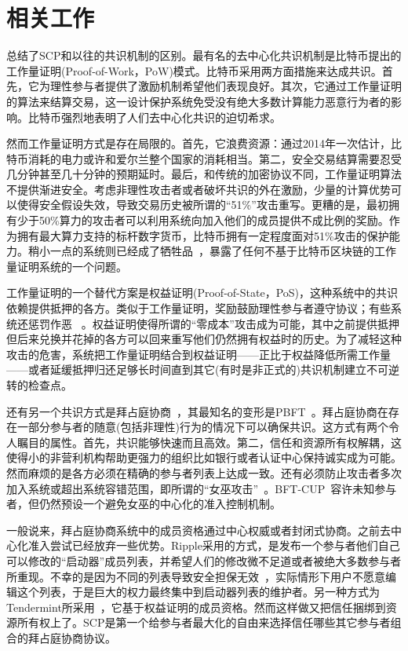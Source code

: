 \section{相关工作}

总结了SCP和以往的共识机制的区别。最有名的去中心化共识机制是比特币提出的工作量证明(Proof-of-Work，PoW)模式。比特币采用两方面措施来达成共识。首先，它为理性参与者提供了激励机制希望他们表现良好。其次，它通过工作量证明的算法来结算交易，这一设计保护系统免受没有绝大多数计算能力恶意行为者的影响。比特币强烈地表明了人们去中心化共识的迫切希求。

然而工作量证明方式是存在局限的。首先，它浪费资源：通过2014年一次估计，比特币消耗的电力或许和爱尔兰整个国家的消耗相当。第二，安全交易结算需要忍受几分钟甚至几十分钟的预期延时。最后，和传统的加密协议不同，工作量证明算法不提供渐进安全。考虑非理性攻击者或者破坏共识的外在激励，少量的计算优势可以使得安全假设失效，导致交易历史被所谓的``51\%''攻击重写。更糟的是，最初拥有少于50\%算力的攻击者可以利用系统向加入他们的成员提供不成比例的奖励。作为拥有最大算力支持的标杆数字货币，比特币拥有一定程度面对51\%攻击的保护能力。稍小一点的系统则已经成了牺牲品~\cite{attack_bbt2013,attack_cb2013}，暴露了任何不基于比特币区块链的工作量证明系统的一个问题。

工作量证明的一个替代方案是权益证明(Proof-of-State，PoS)，这种系统中的共识依赖提供抵押的各方。类似于工作量证明，奖励鼓励理性参与者遵守协议；有些系统还惩罚作恶~\cite{slasher2014, neucoin2015} 。权益证明使得所谓的``零成本''攻击成为可能，其中之前提供抵押但后来兑换并花掉的各方可以回来重写他们仍然拥有权益时的历史。为了减轻这种攻击的危害，系统把工作量证明结合到权益证明——正比于权益降低所需工作量——或者延缓抵押归还足够长时间直到其它(有时是非正式的)共识机制建立不可逆转的检查点。

还有另一个共识方式是拜占庭协商~\cite{Pease:1980:RAP:322186.322188,Lamport:1982:BGP:357172.357176}，其最知名的变形是PBFT~\cite{Castro:1999:PBFT}。拜占庭协商在存在一部分参与者的随意(包括非理性)行为的情况下可以确保共识。这方式有两个令人瞩目的属性。首先，共识能够快速而且高效。第二，信任和资源所有权解耦，这使得小的非营利机构帮助更强力的组织比如银行或者认证中心保持诚实成为可能。然而麻烦的是各方必须在精确的参与者列表上达成一致。还有必须防止攻击者多次加入系统或超出系统容错范围，即所谓的``女巫攻击''~\cite{Douceur:2002:SA:646334.687813}。BFT-CUP~\cite{Alchieri:2008:BCU:1496310.1496316}容许未知参与者，但仍然预设一个避免女巫的中心化的准入控制机制。

一般说来，拜占庭协商系统中的成员资格通过中心权威或者封闭式协商。之前去中心化准入尝试已经放弃一些优势。Ripple采用的方式，是发布一个参与者他们自己可以修改的``启动器''成员列表，并希望人们的修改微不足道或者被绝大多数参与者所重现。不幸的是因为不同的列表导致安全担保无效~\cite{ripple2014}，实际情形下用户不愿意编辑这个列表，于是巨大的权力最终集中到启动器列表的维护者。另一种方式为Tendermint所采用~\cite{tendermint2014}，它基于权益证明的成员资格。然而这样做又把信任捆绑到资源所有权上了。SCP是第一个给参与者最大化的自由来选择信任哪些其它参与者组合的拜占庭协商协议。